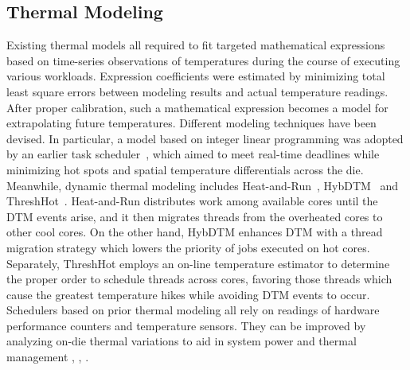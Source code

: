 \documentclass[times, 10pt,twocolumn]{IEEEtran}
\begin{document}
\subsection{Thermal Modeling}
\label{sec:thermal-modeling}
Existing thermal models all required to fit targeted mathematical
expressions based on time-series observations of temperatures during the
course of executing various workloads.  Expression coefficients were
estimated by minimizing total least square errors between modeling
results and actual temperature readings.  After proper calibration, such
a mathematical expression becomes a model for extrapolating future
temperatures.  Different modeling techniques have been devised.  In
particular, a model based on integer linear programming was adopted by
an earlier task scheduler~\cite{Kursun2009}, which aimed to meet
real-time deadlines while minimizing hot spots and spatial temperature
differentials across the die.  Meanwhile, dynamic thermal modeling
includes Heat-and-Run~\cite{Gomaa2004}, HybDTM~\cite{Ayoub2011} and
ThreshHot~\cite{Yang2008}.  Heat-and-Run distributes
work among available cores until the DTM events arise, and it then
migrates threads from the overheated cores to other cool cores.  On the
other hand, HybDTM enhances DTM with a thread migration strategy which
lowers the priority of jobs executed on hot cores.  Separately,
ThreshHot employs an on-line temperature estimator to determine the
proper order to schedule threads across cores, favoring those threads
which cause the greatest temperature hikes while avoiding DTM events to
occur.  Schedulers based on prior thermal modeling all rely on readings
of hardware performance counters and temperature sensors.  They can be
improved by analyzing on-die thermal variations to aid in system power
and thermal management \cite{Kursun2009}, \cite{Bailis2011}, \cite{Murali2008}.
\end{document}
